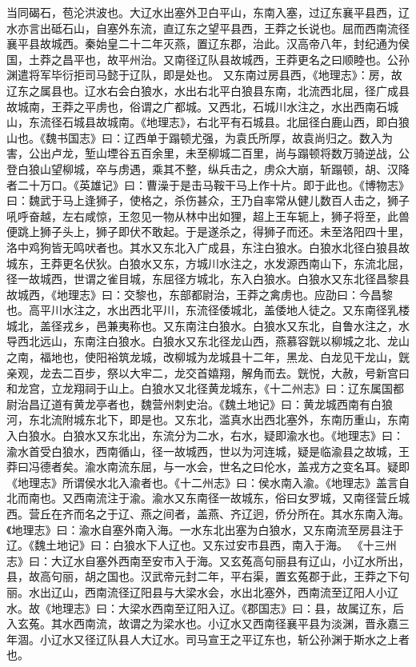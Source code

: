 \documentclass[12pt,UTF8]{ctexbook}
\begin{document}
当同碣石，苞沦洪波也。大辽水出塞外卫白平山，东南入塞，过辽东襄平县西，辽水亦言出砥石山，自塞外东流，直辽东之望平县西，王莽之长说也。屈而西南流径襄平县故城西。秦始皇二十二年灭燕，置辽东郡，治此。汉高帝八年，封纪通为侯国，土莽之昌平也，故平州治。又南径辽队县故城西，王莽更名之曰顺睦也。公孙渊遣将军毕衍拒司马懿于辽队，即是处也。
又东南过房县西，《地理志》：房，故辽东之属县也。辽水右会白狼水，水出右北平白狼县东南，北流西北屈，径广成县故城南，王莽之平虏也，俗谓之广都城。又西北，石城川水注之，水出西南石城山，东流径石城县故城南。《地理志》，右北平有石城县。北屈径白鹿山西，即白狼山也。《魏书国志》曰：辽西单于蹋顿尤强，为袁氏所厚，故袁尚归之。数入为害，公出卢龙，堑山堙谷五百余里，未至柳城二百里，尚与蹋顿将数万骑逆战，公登白狼山望柳城，卒与虏遇，乘其不整，纵兵击之，虏众大崩，斩蹋顿，胡、汉降者二十万口。《英雄记》曰：曹澡于是击马鞍干马上作十片。即于此也。《博物志》曰：魏武于马上逢狮子，使格之，杀伤甚众，王乃自率常从健儿数百人击之，狮子吼呼奋越，左右咸惊，王忽见一物从林中出如狸，超上王车轭上，狮子将至，此兽便跳上狮子头上，狮子即伏不敢起。于是遂杀之，得狮子而还。未至洛阳四十里，洛中鸡狗皆无鸣吠者也。其水又东北入广成县，东注白狼水。白狼水北径白狼县故城东，王莽更名伏狄。白狼水又东，方城川水注之，水发源西南山下，东流北屈，径一故城西，世谓之雀目城，东屈径方城北，东入白狼水。白狼水又东北径昌黎县故城西，《地理志》曰：交黎也，东部都尉治，王莽之禽虏也。应劭曰：今昌黎也。高平川水注之，水出西北平川，东流径倭城北，盖倭地人徒之。又东南径乳楼城北，盖径戎乡，邑兼夷称也。又东南注白狼水。白狼水又东北，自鲁水注之，水导西北远山，东南注白狼水。白狼水又东北径龙山西，燕慕容皝以柳城之北、龙山之南，福地也，使阳裕筑龙城，改柳城为龙城县十二年，黑龙、白龙见干龙山，皝亲观，龙去二百步，祭以大牢二，龙交首嬉翔，解角而去。皝悦，大赦，号新宫曰和龙宫，立龙翔祠于山上。白狼水又北径黄龙城东，《十二州志》曰：辽东属国都尉治昌辽道有黄龙亭者也，魏营州刺史治。《魏土地记》曰：黄龙城西南有白狼河，东北流附城东北下，即是也。又东北，滥真水出西北塞外，东南历重山，东南入白狼水。白狼水又东北出，东流分为二水，右水，疑即渝水也。《地理志》曰：渝水首受白狼水，西南循山，径一故城西，世以为河连城，疑是临渝县之故城，王莽曰冯德者矣。渝水南流东屈，与一水会，世名之曰伦水，盖戎方之变名耳。疑即《地理志》所谓侯水北入渝者也。《十二州志》曰：侯水南入渝。《地理志》盖言自北而南也。又西南流注于渝。渝水又东南径一故城东，俗曰女罗城，又南径营丘城西。营丘在齐而名之于辽、燕之间者，盖燕、齐辽迥，侨分所在。其水东南入海。《地理志》曰：渝水自塞外南入海。一水东北出塞为白狼水，又东南流至房县注于辽。《魏土地记》曰：白狼水下人辽也。又东过安市县西，南入于海。
《十三州志》曰：大辽水自塞外西南至安市入于海。又玄菟高句丽县有辽山，小辽水所出，县，故高句丽，胡之国也。汉武帝元封二年，平右渠，置玄菟郡于此，王莽之下句丽。水出辽山，西南流径辽阳县与大梁水会，水出北塞外，西南流至辽阳人小辽水。故《地理志》曰：大梁水西南至辽阳入辽。《郡国志》曰：县，故属辽东，后入玄菟。其水西南流，故谓之为梁水也。小辽水又西南径襄平县为淡渊，晋永嘉三年涸。小辽水又径辽队县人大辽水。司马宣王之平辽东也，斩公孙渊于斯水之上者也。
\end{document}
